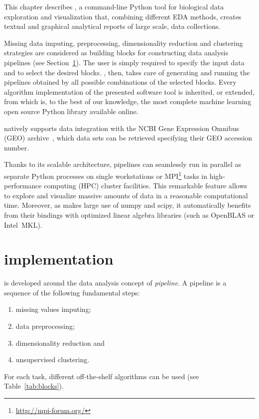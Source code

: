 This chapter describes \ade, a command-line Python tool for biological data exploration and visualization that, combining different EDA methods, creates textual and graphical analytical reports of large scale, data collections.

Missing data imputing, preprocessing, dimensionality reduction and clustering strategies are considered as building blocks for constructing data analysis pipelines (see Section~\ref{sec:adenine_implementation}). The user is simply required to specify the input data and to select the desired blocks. \ade, then, takes care of generating and running the pipelines obtained by all possible combinations of the selected blocks. Every algorithm implementation of the presented software tool is inherited, or extended, from \sklearn \cite{scikit-learn} which is, to the best of our knowledge, the most complete machine learning open source Python library available online.

\ade natively supports data integration with the NCBI Gene Expression Omnibus (GEO) archive~\cite{barrett2013ncbi}, which data sets can be retrieved specifying their GEO accession number.

Thanks to its scalable architecture, \ade pipelines can seamlessly run in parallel as separate Python processes on single workstations or MPI\footnote{\url{http://mpi-forum.org/}} tasks in high-performance computing (HPC) cluster facilities. This remarkable feature allows to explore and visualize massive amounts of data in a reasonable computational time.
Moreover, as \ade makes large use of {\sc numpy} and {\sc scipy}, it automatically benefits from their bindings with optimized linear algebra libraries (such as OpenBLAS or Intel\textsuperscript{\textregistered}~MKL).

\section{\ade implementation} \label{sec:adenine_implementation}
\ade is developed around the data analysis concept of \emph{pipeline}. A pipeline is a sequence of the following fundamental steps:
\begin{enumerate}
  \item missing values imputing;
  \item data preprocessing;
  \item dimensionality reduction and
  \item unsupervised clustering.
\end{enumerate}
For each task, different off-the-shelf algorithms can be used (see Table~\ref{tab:blocks}).

